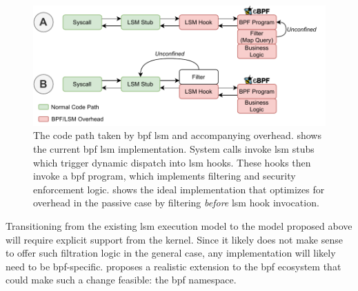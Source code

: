 \begin{figure}[htpb]
  \centering
  \includegraphics[width=0.8\linewidth]{figs/discussion/hooks.pdf}
  \caption[The code path taken by BPF LSM and accompanying overhead]{
    The code path taken by \gls{bpf} \gls{lsm} and accompanying overhead.  shows the current \gls{bpf}
    \gls{lsm} implementation. System calls invoke \gls{lsm} stubs which trigger dynamic
    dispatch into \gls{lsm} hooks. These hooks then invoke a \gls{bpf} program, which
    implements filtering and security enforcement logic.  shows the ideal
    implementation that optimizes for overhead in the passive case by filtering
    \textit{before} \gls{lsm} hook invocation.
  }%
  \label{fig:disc-hooks}
\end{figure}

Transitioning from the existing \gls{lsm} execution model to the model proposed above will
require explicit support from the kernel. Since it likely does not make sense to offer
such filtration logic in the general case, any implementation will likely need to be
\gls{bpf}-specific.  proposes a realistic extension to the
\gls{bpf} ecosystem that could make such a change feasible: the \gls{bpf} namespace.

